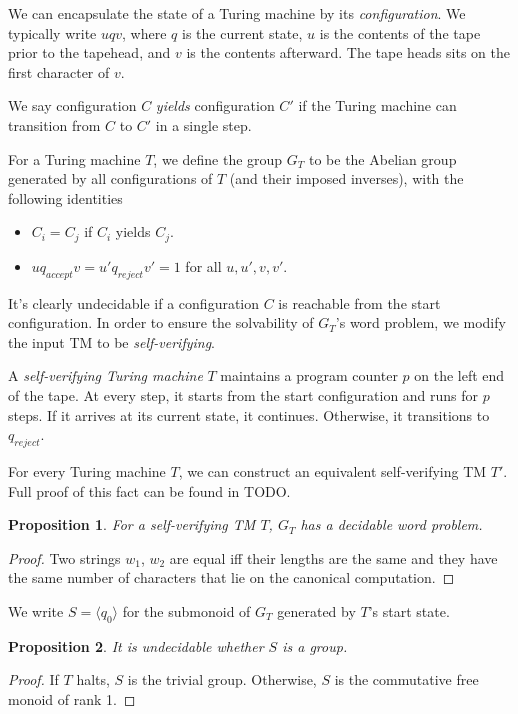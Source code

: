 \documentclass[10pt,a4paper]{article} %
\theoremstyle{pleasant}
\newtheorem{proposition}{Proposition}
\newcommand{\defn}[1]{\textit{#1}}
\begin{document}
    We can encapsulate the state of a Turing machine by its \defn{configuration}. We typically write $u q v$, where $q$ is the current state, $u$ is the contents of the tape prior to the tapehead, and $v$ is the contents afterward. The tape heads sits on the first character of $v$. 

    We say configuration $C$ \defn{yields} configuration $C'$ if the Turing machine can transition from $C$ to $C'$ in a single step.

    For a Turing machine $T$, we define the group $G_T$ to be the Abelian group generated by all configurations of $T$ (and their imposed inverses), with the following identities
    \begin{itemize}
    \item $C_i = C_j$ if $C_i$ yields $C_j$.
    \item $uq_{accept}v = u'q_{reject}v' = 1$ for all $u, u', v, v'$.
    \end{itemize}

    It's clearly undecidable if a configuration $C$ is reachable from the start configuration. In order to ensure the solvability of $G_T$'s word problem, we modify the input TM to be \defn{self-verifying}. 

    A \defn{self-verifying Turing machine} $T$ maintains a program counter $p$ on the left end of the tape. At every step, it starts from the start configuration and runs for $p$ steps. If it arrives at its current state, it continues. Otherwise, it transitions to $q_{reject}$. 

    For every Turing machine $T$, we can construct an equivalent self-verifying TM $T'$. Full proof of this fact can be found in TODO.

    \begin{proposition}
    For a self-verifying TM $T$, $G_T$ has a decidable word problem.
    \end{proposition}
    \begin{proof}
    Two strings $w_1$, $w_2$ are equal iff their lengths are the same and they have the same number of characters that lie on the canonical computation.
    \end{proof}

    We write $S = \langle q_0 \rangle$ for the submonoid of $G_T$ generated by $T$'s start state.

    \begin{proposition}
    It is undecidable whether $S$ is a group.
    \end{proposition}
    \begin{proof}
    If $T$ halts, $S$ is the trivial group. Otherwise, $S$ is the commutative free monoid of rank 1.
    \end{proof}
\end{document}

